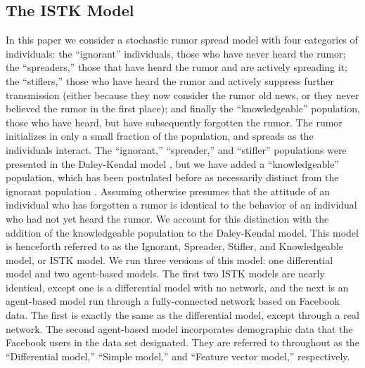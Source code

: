 \subsection{The ISTK Model}
\label{subsec:istk}

In this paper we consider a stochastic rumor spread model with four categories of individuals: the ``ignorant'' individuals, those who have never heard the rumor; the ``spreaders,'' those that have heard the rumor and are actively spreading it; the ``stiflers,'' those who have heard the rumor and actively suppress further transmission (either because they now consider the rumor old news, or they never believed the rumor in the first place); and finally the ``knowledgeable'' population, those who have heard, but have subsequently forgotten the rumor. The rumor initializes in only a small fraction of the population, and spreads as the individuals interact. The ``ignorant,'' ``spreader,'' and ``stifler'' populations were presented in the Daley-Kendal model \cite{daley-1965}, but we have added a ``knowledgeable'' population, which has been postulated before as necessarily distinct from the ignorant population \cite{zhao-2012, zhao-2011}. Assuming otherwise presumes that the attitude of an individual who has forgotten a rumor is identical to the behavior of an individual who had not yet heard the rumor. We account for this distinction with the addition of the knowledgeable population to the Daley-Kendal model. This model is henceforth referred to as the Ignorant, Spreader, Stifler, and Knowledgeable model, or ISTK model. We run three versions of this model: one differential model and two agent-based models. The first two ISTK models are nearly identical, except one is a differential model with no network, and the next is an agent-based model run through a fully-connected network based on Facebook data. The first is exactly the same as the differential model, except through a real network. The second agent-based model incorporates demographic data that the Facebook users in the data set designated. They are referred to throughout as the ``Differential model,''  ``Simple model,'' and ``Feature vector model,'' respectively.

